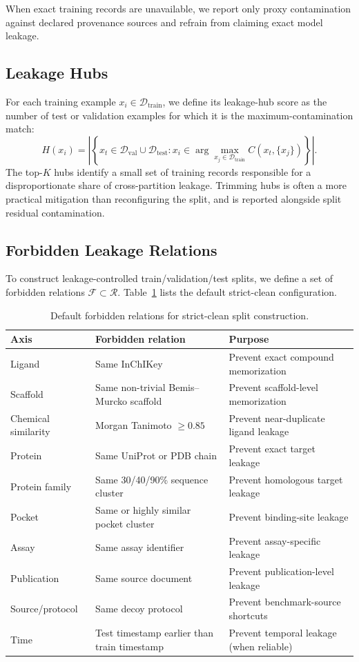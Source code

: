 \documentclass[11pt]{article}
\begin{document}
When exact training records are unavailable, we report only proxy contamination against declared provenance sources and refrain from claiming exact model leakage.

\subsection{Leakage Hubs}

For each training example \(x_i \in \mathcal{D}_{\mathrm{train}}\), we define its leakage-hub score as the number of test or validation examples for which it is the maximum-contamination match:
\[
H(x_i)
=
\left|
\left\{ x_t \in \mathcal{D}_{\mathrm{val}} \cup \mathcal{D}_{\mathrm{test}} :
x_i \in \arg\max_{x_j \in \mathcal{D}_{\mathrm{train}}} C(x_t, \{x_j\})
\right\}
\right|.
\]
The top-\(K\) hubs identify a small set of training records responsible for a disproportionate share of cross-partition leakage. Trimming hubs is often a more practical mitigation than reconfiguring the split, and is reported alongside split residual contamination.

\subsection{Forbidden Leakage Relations}

To construct leakage-controlled train/validation/test splits, we define a set of forbidden relations \(\mathcal{F} \subset \mathcal{R}\). Table~\ref{tab:forbidden} lists the default strict-clean configuration.

\begin{table}[h]
\centering
\caption{Default forbidden relations for strict-clean split construction.}
\label{tab:forbidden}
\begin{tabular}{lll}
\toprule
\textbf{Axis} & \textbf{Forbidden relation} & \textbf{Purpose} \\
\midrule
Ligand & Same InChIKey & Prevent exact compound memorization \\
Scaffold & Same non-trivial Bemis--Murcko scaffold & Prevent scaffold-level memorization \\
Chemical similarity & Morgan Tanimoto \(\geq 0.85\) & Prevent near-duplicate ligand leakage \\
Protein & Same UniProt or PDB chain & Prevent exact target leakage \\
Protein family & Same 30/40/90\% sequence cluster & Prevent homologous target leakage \\
Pocket & Same or highly similar pocket cluster & Prevent binding-site leakage \\
Assay & Same assay identifier & Prevent assay-specific leakage \\
Publication & Same source document & Prevent publication-level leakage \\
Source/protocol & Same decoy protocol & Prevent benchmark-source shortcuts \\
Time & Test timestamp earlier than train timestamp & Prevent temporal leakage (when reliable) \\
\bottomrule
\end{tabular}
\end{table}
\end{document}
